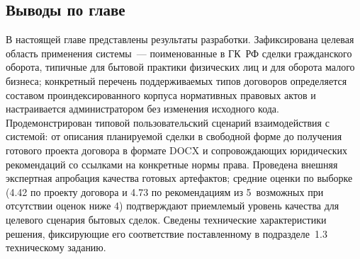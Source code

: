 \subsection{Выводы по главе}

В настоящей главе представлены результаты разработки. Зафиксирована целевая область применения системы~--- поименованные в ГК~РФ сделки гражданского оборота, типичные для бытовой практики физических лиц и для оборота малого бизнеса; конкретный перечень поддерживаемых типов договоров определяется составом проиндексированного корпуса нормативных правовых актов и настраивается администратором без изменения исходного кода. Продемонстрирован типовой пользовательский сценарий взаимодействия с системой: от описания планируемой сделки в свободной форме до получения готового проекта договора в формате DOCX и сопровождающих юридических рекомендаций со ссылками на конкретные нормы права. Проведена внешняя экспертная апробация качества готовых артефактов; средние оценки по выборке (4.42 по проекту договора и 4.73 по рекомендациям из 5~возможных при отсутствии оценок ниже 4) подтверждают приемлемый уровень качества для целевого сценария бытовых сделок. Сведены технические характеристики решения, фиксирующие его соответствие поставленному в подразделе~1.3 техническому заданию.